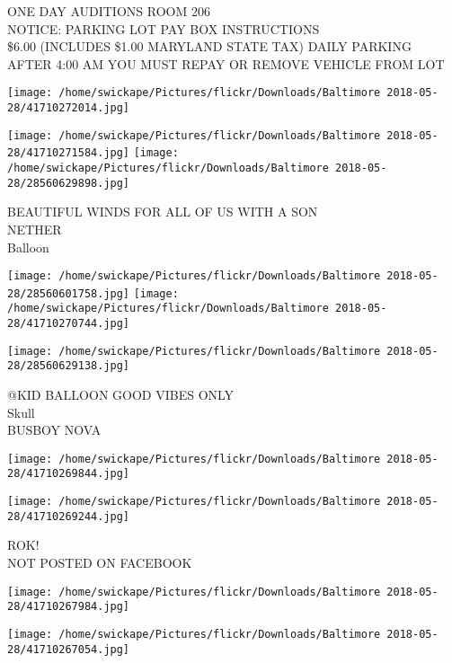 \documentclass[10pt,letterpaper]{article}
\begin{document}
ONE DAY AUDITIONS ROOM 206\\
NOTICE: PARKING LOT PAY BOX INSTRUCTIONS\\
\$6.00 (INCLUDES \$1.00 MARYLAND STATE TAX) DAILY PARKING AFTER 4:00 AM YOU MUST REPAY OR REMOVE VEHICLE FROM LOT\\
\pagebreak

\texttt{[image: /home/swickape/Pictures/flickr/Downloads/Baltimore 2018-05-28/41710272014.jpg]}

\vspace{0.25in}
\texttt{[image: /home/swickape/Pictures/flickr/Downloads/Baltimore 2018-05-28/41710271584.jpg]}
\texttt{[image: /home/swickape/Pictures/flickr/Downloads/Baltimore 2018-05-28/28560629898.jpg]}

BEAUTIFUL WINDS FOR ALL OF US WITH A SON\\
NETHER\\
Balloon\\
\pagebreak

\texttt{[image: /home/swickape/Pictures/flickr/Downloads/Baltimore 2018-05-28/28560601758.jpg]}
\texttt{[image: /home/swickape/Pictures/flickr/Downloads/Baltimore 2018-05-28/41710270744.jpg]}

\texttt{[image: /home/swickape/Pictures/flickr/Downloads/Baltimore 2018-05-28/28560629138.jpg]}

@KID BALLOON GOOD VIBES ONLY\\
Skull\\
BUSBOY NOVA\\
\pagebreak

\texttt{[image: /home/swickape/Pictures/flickr/Downloads/Baltimore 2018-05-28/41710269844.jpg]}

\vspace{0.25in}
\texttt{[image: /home/swickape/Pictures/flickr/Downloads/Baltimore 2018-05-28/41710269244.jpg]}

ROK!\\
NOT POSTED ON FACEBOOK\\
\pagebreak

\texttt{[image: /home/swickape/Pictures/flickr/Downloads/Baltimore 2018-05-28/41710267984.jpg]}

\vspace{0.25in}
\texttt{[image: /home/swickape/Pictures/flickr/Downloads/Baltimore 2018-05-28/41710267054.jpg]}
\end{document}
